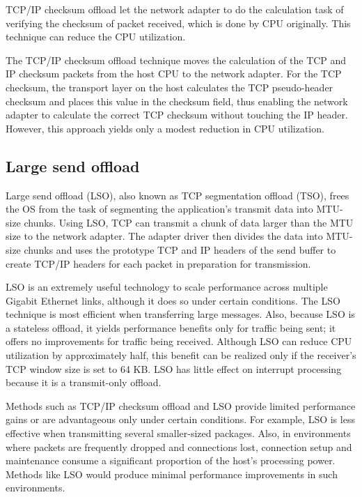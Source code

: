\documentclass[bsc,frontabs,twoside,singlespacing,parskip,deptreport]{infthesis}     %
\begin{document}

TCP/IP checksum offload let the network adapter to do the calculation task of verifying the checksum of packet received, which is done by CPU originally. This technique can reduce the CPU utilization.


The TCP/IP checksum offload technique moves the calculation of
the TCP and IP checksum packets from the host CPU to the network
adapter. For the TCP checksum, the transport layer on the host calculates
the TCP pseudo-header checksum and places this value in
the checksum field, thus enabling the network adapter to calculate
the correct TCP checksum without touching the IP header. However,
this approach yields only a modest reduction in CPU utilization.



\subsection{Large send offload}

Large send offload (LSO), also known as TCP segmentation offload
(TSO), frees the OS from the task of segmenting the application’s
transmit data into MTU-size chunks. Using LSO, TCP can transmit
a chunk of data larger than the MTU size to the network adapter.
The adapter driver then divides the data into MTU-size chunks and
uses the prototype TCP and IP headers of the send buffer to create
TCP/IP headers for each packet in preparation for transmission.



LSO is an extremely useful technology to scale performance
across multiple Gigabit Ethernet links, although it does so under certain
conditions. The LSO technique is most efficient when transferring
large messages. Also, because LSO is a stateless offload, it yields
performance benefits only for traffic being sent; it offers no improvements
for traffic being received. Although LSO can reduce CPU utilization
by approximately half, this benefit can be realized only if
the receiver’s TCP window size is set to 64 KB. LSO has little effect
on interrupt processing because it is a transmit-only offload.


Methods such as TCP/IP checksum offload and LSO provide limited performance gains or are advantageous only under certain conditions. For example, LSO is less effective when transmitting several smaller-sized packages. Also, in environments where packets are frequently dropped and connections lost, connection setup and maintenance consume a significant proportion of the host’s processing power. Methods like LSO would produce minimal performance improvements in such environments.
\end{document}

